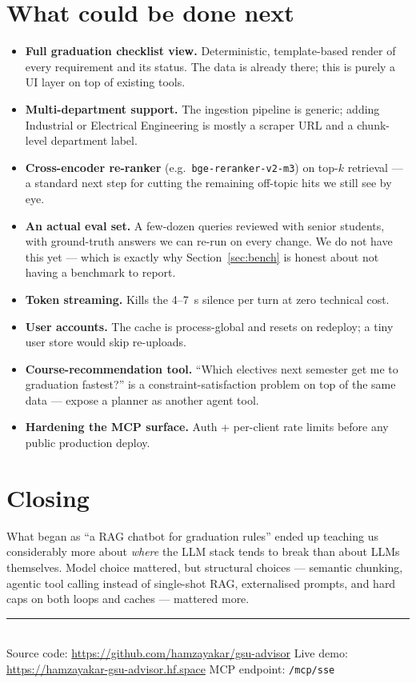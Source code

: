 \documentclass[11pt,a4paper]{article}
\begin{document}
\section{What could be done next}

\begin{itemize}[leftmargin=*, itemsep=0.15em]
    \item \textbf{Full graduation checklist view.} Deterministic, template-based
          render of every requirement and its status. The data is already there;
          this is purely a UI layer on top of existing tools.
    \item \textbf{Multi-department support.} The ingestion pipeline is generic;
          adding Industrial or Electrical Engineering is mostly a scraper URL
          and a chunk-level department label.
    \item \textbf{Cross-encoder re-ranker} (e.g.\ \texttt{bge-reranker-v2-m3})
          on top-$k$ retrieval --- a standard next step for cutting the
          remaining off-topic hits we still see by eye.
    \item \textbf{An actual eval set.} A few-dozen queries reviewed with senior
          students, with ground-truth answers we can re-run on every change.
          We do not have this yet --- which is exactly why Section~\ref{sec:bench}
          is honest about not having a benchmark to report.
    \item \textbf{Token streaming.} Kills the 4--7~s silence per turn at zero
          technical cost.
    \item \textbf{User accounts.} The cache is process-global and resets on
          redeploy; a tiny user store would skip re-uploads.
    \item \textbf{Course-recommendation tool.} ``Which electives next semester
          get me to graduation fastest?'' is a constraint-satisfaction problem
          on top of the same data --- expose a planner as another agent tool.
    \item \textbf{Hardening the MCP surface.} Auth + per-client rate limits
          before any public production deploy.
\end{itemize}

\section*{Closing}

What began as ``a RAG chatbot for graduation rules'' ended up teaching us
considerably more about \emph{where} the LLM stack tends to break than about
LLMs themselves. Model choice mattered, but structural choices ---
semantic chunking, agentic tool calling instead of single-shot RAG,
externalised prompts, and hard caps on both loops and caches --- mattered more.

\vspace{0.6em}
\noindent\rule{\linewidth}{0.4pt}\\
\small Source code: \url{https://github.com/hamzayakar/gsu-advisor} \quad
Live demo: \url{https://hamzayakar-gsu-advisor.hf.space} \quad
MCP endpoint: \texttt{/mcp/sse}
\end{document}
